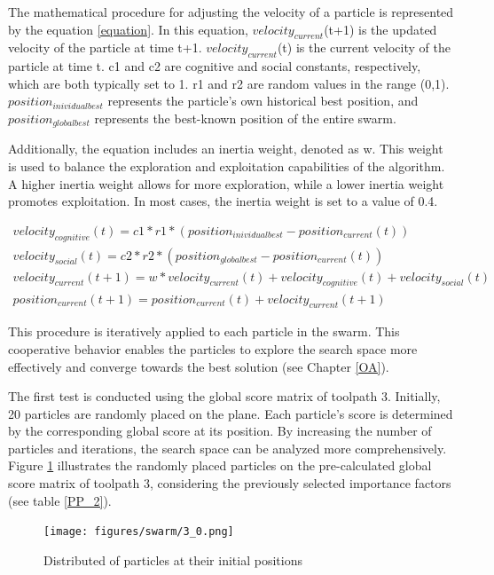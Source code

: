 The mathematical procedure for adjusting the velocity of a particle is represented by the equation \ref{equation}.
In this equation, $velocity_{current}$(t+1) is the updated velocity of the particle at time t+1. $velocity_{current}$(t) is the current velocity of the particle at time t. c1 and c2 are cognitive and social constants, respectively, which are both typically set to 1. r1 and r2 are random values in the range (0,1). $position_{inividual best}$ represents the particle's own historical best position, and $position_{global best}$ represents the best-known position of the entire swarm.

Additionally, the equation includes an inertia weight, denoted as w. This weight is used to balance the exploration and exploitation capabilities of the algorithm. A higher inertia weight allows for more exploration, while a lower inertia weight promotes exploitation. In most cases, the inertia weight is set to a value of 0.4.


\begin{equation}
	\begin{array}{l} 
	velocity_{cognitive}(t) = c1 * r1 * (position_{inividual best} - position_{current}(t))\\

	velocity_{social}(t) = c2 * r2 * (position_{global best} - position_{current}(t))\\

	velocity_{current}(t+1) = w * velocity_{current}(t) + velocity_{cognitive}(t) + velocity_{social}(t)\\
	
	position_{current}(t+1) = position_{current}(t) + velocity_{current}(t+1)
	\end{array}
	\label{equation}
\end{equation}  


This procedure is iteratively applied to each particle in the swarm. This cooperative behavior enables the particles to explore the search space more effectively and converge towards the best solution (see Chapter \ref{OA}).

The first test is conducted using the global score matrix of toolpath 3. Initially, 20 particles are randomly placed on the plane. Each particle's score is determined by the corresponding global score at its position. By increasing the number of particles and iterations, the search space can be analyzed more comprehensively. Figure \ref{PSO_1} illustrates the randomly placed particles on the pre-calculated global score matrix of toolpath 3, considering the previously selected importance factors (see table \ref{PP_2}).
\newpage
\begin{figure}[H]
	\centerline{\texttt{[image: figures/swarm/3\_0.png]}}
	\caption{Distributed of particles at their initial positions}
	\label{PSO_1}
\end{figure}



